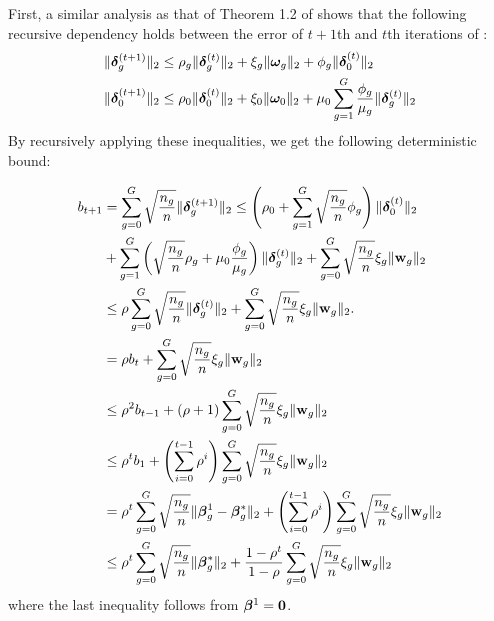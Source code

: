 \begin{IEEEproof}
	First, a similar analysis as that of Theorem 1.2 of \cite{oyrs15} shows that the following recursive dependency holds between the error of $t+1$th and $t$th iterations of \dc{}:
	\begin{align} 
		\nonumber 
		\|\boldsymbol{\delta}_g^{(t+1)}\|_{2} &\leq   \rho_g\|\boldsymbol{\delta}_g^{(t)}\|_{2}   +  \xi_g \|\boldsymbol{\omega}_g\|_{2} + \phi_g \|\boldsymbol{\delta}_0^{(t)}\|_{2} 
		\\ \nonumber 
		\|\boldsymbol{\delta}_0^{(t+1)}\|_{2} &\leq   \rho_0 \|\boldsymbol{\delta}_0^{(t)}\|_{2} + \xi_0 \|\boldsymbol{\omega}_0\|_{2} + \mu_0 \sum_{g=1}^{G}  \frac{\phi_g}{\mu_g} \|\boldsymbol{\delta}_g^{(t)}\|_{2}  
	\end{align} 
	By recursively applying these inequalities, we get the following deterministic bound:%
	
	{\small\begin{align}
	\nonumber 
	b_{t+1} &= \sum_{g=0}^{G} \sqrt{\frac{n_g}{n}} \|\boldsymbol{\delta}_g^{(t+1)}\|_{2} 
	\leq  \left(\rho_0 + \sum_{g=1}^{G} \sqrt{\frac{n_g}{n}} \phi_g\right)  \|\boldsymbol{\delta}_0^{(t)}\|_{2} 
	\\ \nonumber 
	&+ \sum_{g=1}^{G} \left(\sqrt{\frac{n_g}{n}} \rho_g + \mu_0 \frac{\phi_g}{\mu_g} \right) \|\boldsymbol{\delta}_g^{(t)}\|_{2} + \sum_{g=0}^{G} \sqrt{\frac{n_g}{n}}  \xi_g \|\mathbf{w}_g\|_{2} 
	\\ \nonumber
	&\leq  \rho \sum_{g=0}^{G} \sqrt{\frac{n_g}{n}} \|\boldsymbol{\delta}_g^{(t)}\|_{2} + \sum_{g=0}^{G} \sqrt{\frac{n_g}{n}}  \xi_g \|\mathbf{w}_g\|_{2}. 
	\\ \nonumber
	&=  \rho b_{t} +  \sum_{g=0}^{G} \sqrt{\frac{n_g}{n}} \xi_g \|\mathbf{w}_g\|_{2} \\ \nonumber 
	&\leq \rho^2 b_{t-1}  + ( \rho + 1)  \sum_{g=0}^{G} \sqrt{\frac{n_g}{n}} \xi_g \|\mathbf{w}_g\|_{2} \\ \nonumber
	&\leq \rho^t b_1  + \left(\sum_{i = 0}^{t-1} \rho^i \right)   \sum_{g=0}^{G} \sqrt{\frac{n_g}{n}} \xi_g \|\mathbf{w}_g\|_{2} \\ \nonumber 
	&= \rho^t \sum_{g=0}^{G}\sqrt{\frac{n_g}{n}} \|\boldsymbol{\beta} ^1_g  - \boldsymbol{\beta} ^*_g\|_{2}  + \left(\sum_{i = 0}^{t-1} \rho^i \right)     \sum_{g=0}^{G} \sqrt{\frac{n_g}{n}} \xi_g \|\mathbf{w}_g\|_{2} \\ \nonumber 
	&\leq \rho^t \sum_{g=0}^{G}\sqrt{\frac{n_g}{n}} \|\boldsymbol{\beta} ^*_g\|_{2}   + \frac{1 - \rho^t}{1 -  \rho}   \sum_{g=0}^{G} \sqrt{\frac{n_g}{n}} \xi_g \|\mathbf{w}_g\|_{2} 
	\end{align}	}	
where the last inequality follows from $\boldsymbol{\beta} ^1  = \mathbf{0}$.
\end{IEEEproof}




